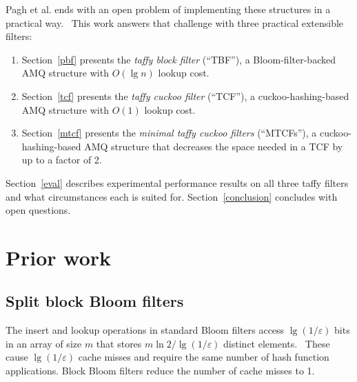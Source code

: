 \documentclass[sigconf]{acmart}
\newcommand{\etal}{et al.}
\begin{document}

Pagh \etal{} ends with an open problem of implementing these structures in a practical way.~\cite{psw}
This work answers that challenge with three practical extensible filters:

\begin{enumerate}
\item Section~\ref{pbf}  presents the {\em taffy block filter}           (``TBF''),   a Bloom-filter-backed  AMQ structure with $O(\lg n)$ lookup cost.
\item Section~\ref{tcf}  presents the {\em taffy cuckoo filter}          (``TCF''),   a cuckoo-hashing-based AMQ structure with $O(1)$ lookup cost.
\item Section~\ref{mtcf} presents the {\em minimal taffy cuckoo filters} (``MTCFs''), a cuckoo-hashing-based AMQ structure that decreases the space needed in a TCF by up to a factor of 2.
\end{enumerate}

Section~\ref{eval} describes experimental performance results on all three taffy filters and what circumstances each is suited for. %
Section~\ref{conclusion} concludes with open questions.


\section{Prior work}

\subsection{Split block Bloom filters}



The insert and lookup operations in standard Bloom filters access $\lg (1/\varepsilon)$ bits in an array of size $m$ that stores $m \ln 2 / \lg(1/\varepsilon)$ distinct elements.~\cite{bloom-original}
These cause $\lg (1/\varepsilon)$ cache misses and require the same number of hash function applications.
Block Bloom filters reduce the number of cache misses to 1.~\cite{block-bloom}
\end{document}
